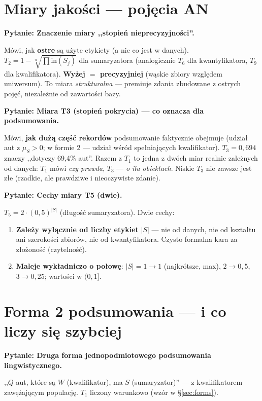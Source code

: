 \documentclass[11pt]{article}
\newcommand{\inn}{\ensuremath{\mathrm{in}}}
\newcommand{\pytan}[1]{\medskip\noindent\textbf{\textcolor{anbg}{Pytanie:} #1}\par\smallskip}
\begin{document}
\section{Miary jakości --- pojęcia AN}

\pytan{Znaczenie miary ,,stopień nieprecyzyjności''.}
Mówi, jak \textbf{ostre} są użyte etykiety (a nie co jest w danych). $T_2=1-\sqrt[n]{\prod
\inn(S_j)}$ dla sumaryzatora (analogicznie $T_6$ dla kwantyfikatora, $T_9$ dla
kwalifikatora). \textbf{Wyżej $=$ precyzyjniej} (wąskie zbiory względem uniwersum). To
miara \emph{strukturalna} --- premiuje zdania zbudowane z ostrych pojęć, niezależnie od
zawartości bazy.

\pytan{Miara T3 (stopień pokrycia) --- co oznacza dla podsumowania.}
Mówi, \textbf{jak dużą część rekordów} podsumowanie faktycznie obejmuje (udział aut z
$\mu_S>0$; w formie 2 --- udział wśród spełniających kwalifikator). $T_3=0{,}694$ znaczy
,,dotyczy 69{,}4\% aut''. Razem z $T_1$ to jedna z dwóch miar realnie zależnych od danych:
$T_1$ mówi \emph{czy prawda}, $T_3$ --- \emph{o ilu obiektach}. Niskie $T_3$ nie zawsze
jest złe (rzadkie, ale prawdziwe i nieoczywiste zdanie).

\pytan{Cechy miary T5 (dwie).}
$T_5=2\cdot(0{,}5)^{|S|}$ (długość sumaryzatora). Dwie cechy:
\begin{enumerate}[leftmargin=*]
\item \textbf{Zależy wyłącznie od liczby etykiet} $|S|$ --- nie od danych, nie od kształtu
  ani szerokości zbiorów, nie od kwantyfikatora. Czysto formalna kara za złożoność
  (czytelność).
\item \textbf{Maleje wykładniczo o połowę}: $|S|{=}1\to1$ (najkrótsze, max), $2\to0{,}5$,
  $3\to0{,}25$; wartości w $(0,1]$.
\end{enumerate}

\section{Forma 2 podsumowania --- i co liczy się szybciej}

\pytan{Druga forma jednopodmiotowego podsumowania lingwistycznego.}
,,$Q$ aut, które są $W$ (kwalifikator), ma $S$ (sumaryzator)'' --- z kwalifikatorem
zawężającym populację. $T_1$ liczony warunkowo (wzór w §\ref{sec:forms}).
\end{document}

